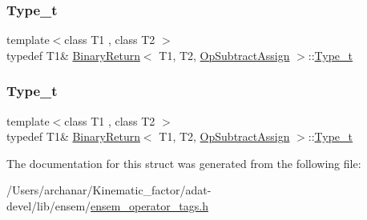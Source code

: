 \mbox{\label{structBinaryReturn_3_01T1_00_01T2_00_01OpSubtractAssign_01_4_a93357e4d56f953a4f58fec3320ba9db3}} 
\subsubsection{\texorpdfstring{Type\_t}{Type\_t}\hspace{0.1cm}{\footnotesize\ttfamily [2/3]}}
{\footnotesize\ttfamily template$<$class T1 , class T2 $>$ \\
typedef T1\& \mbox{\hyperlink{structBinaryReturn}{Binary\+Return}}$<$ T1, T2, \mbox{\hyperlink{structOpSubtractAssign}{Op\+Subtract\+Assign}} $>$\+::\mbox{\hyperlink{structBinaryReturn_3_01T1_00_01T2_00_01OpSubtractAssign_01_4_a93357e4d56f953a4f58fec3320ba9db3}{Type\+\_\+t}}}

\mbox{\label{structBinaryReturn_3_01T1_00_01T2_00_01OpSubtractAssign_01_4_a93357e4d56f953a4f58fec3320ba9db3}} 
\subsubsection{\texorpdfstring{Type\_t}{Type\_t}\hspace{0.1cm}{\footnotesize\ttfamily [3/3]}}
{\footnotesize\ttfamily template$<$class T1 , class T2 $>$ \\
typedef T1\& \mbox{\hyperlink{structBinaryReturn}{Binary\+Return}}$<$ T1, T2, \mbox{\hyperlink{structOpSubtractAssign}{Op\+Subtract\+Assign}} $>$\+::\mbox{\hyperlink{structBinaryReturn_3_01T1_00_01T2_00_01OpSubtractAssign_01_4_a93357e4d56f953a4f58fec3320ba9db3}{Type\+\_\+t}}}



The documentation for this struct was generated from the following file\+:\begin{DoxyCompactItemize}
\item 
/\+Users/archanar/\+Kinematic\+\_\+factor/adat-\/devel/lib/ensem/\mbox{\hyperlink{adat-devel_2lib_2ensem_2ensem__operator__tags_8h}{ensem\+\_\+operator\+\_\+tags.\+h}}\end{DoxyCompactItemize}
